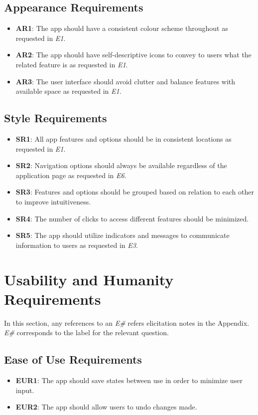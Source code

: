 \documentclass[12pt]{article}
\begin{document}
\subsection{Appearance Requirements}
\begin{itemize}
  \item \textbf{AR1}: The app should have a consistent colour scheme throughout as requested in \textit{E1}.
  \item \textbf{AR2}: The app should have self-descriptive icons to convey to users what the related feature is as requested in \textit{E1}.
  \item \textbf{AR3}: The user interface should avoid clutter and balance features with available space as requested in \textit{E1}.
\end{itemize}
\subsection{Style Requirements}
\begin{itemize}
  \item \textbf{SR1}: All app features and options should be in consistent locations as requested in \textit{E1}.
  \item \textbf{SR2}: Navigation options should always be available regardless of the application page as requested in \textit{E6}.
  \item \textbf{SR3}: Features and options should be grouped based on relation to each other to improve intuitiveness.
  \item \textbf{SR4}: The number of clicks to access different features should be minimized.
  \item \textbf{SR5}: The app should utilize indicators and messages to communicate information to users as requested in \textit{E3}.
\end{itemize}

\section{Usability and Humanity Requirements}
In this section, any references to an \textit{E\#} refers elicitation notes in the Appendix. \textit{E\#} corresponds
to the label for the relevant question.

\subsection{Ease of Use Requirements}
\begin{itemize}
  \item \textbf{EUR1}: The app should save states between use in order to minimize user input.
  \item \textbf{EUR2}: The app should allow users to undo changes made.
\end{itemize}
\end{document}
